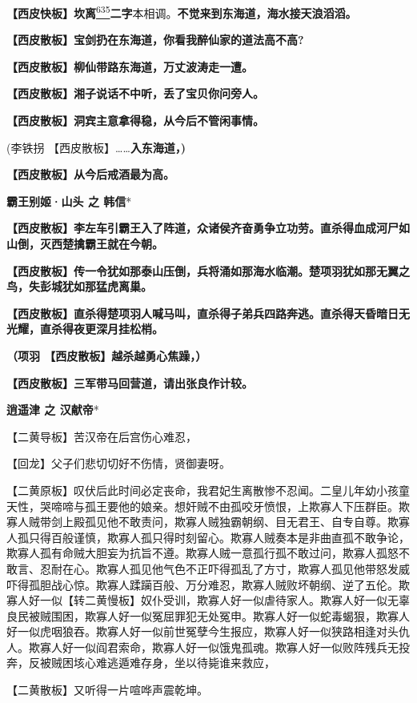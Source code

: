 \textbf{【西皮快板】坎离}\protect\hyperlink{fn635}{\textsuperscript{635}}\textbf{二字}本相调。\textbf{不觉来到东海道，海水接天浪滔滔。}

\textbf{【西皮散板】宝剑扔在东海道，你看我醉仙家的道法高不高?}

\textbf{【西皮散板】柳仙带路东海道，万丈波涛走一遭。}

\textbf{【西皮散板】湘子说话不中听，丢了宝贝你问旁人。}

\textbf{【西皮散板】洞宾主意拿得稳，从今后不管闲事情。}

(李铁拐 【西皮散板】\ldots{}\ldots{}\textbf{入东海道，)}

\textbf{【西皮散板】从今后戒酒最为高。}

\textbf{霸王别姬·山头 之 韩信}*

\textbf{【西皮散板】李左车引霸王入了阵道，众诸侯齐奋勇争立功劳。直杀得血成河尸如山倒，灭西楚擒霸王就在今朝。}

\textbf{【西皮散板】传一令犹如那泰山压倒，兵将涌如那海水临潮。楚项羽犹如那无翼之鸟，失彭城犹如那猛虎离巢。}

\textbf{【西皮散板】直杀得楚项羽人喊马叫，直杀得子弟兵四路奔逃。直杀得天昏暗日无光耀，直杀得夜更深月挂松梢。}

\textbf{（项羽 【西皮散板】越杀越勇心焦躁，）}

\textbf{【西皮散板】三军带马回营道，请出张良作计较。}

\textbf{逍遥津 之 汉献帝}*

【二黄导板】苦汉帝在后宫伤心难忍，

【回龙】父子们悲切切好不伤情，贤御妻呀。

【二黄原板】叹伏后此时间必定丧命，我君妃生离散惨不忍闻。二皇儿年幼小孩童天性，哭啼啼与孤王要他的娘亲。想奸贼不由孤咬牙愤恨，上欺寡人下压群臣。欺寡人贼带剑上殿孤见他不敢责问，欺寡人贼独霸朝纲、目无君王、自专自尊。欺寡人孤只得百般谨慎，欺寡人孤只得时刻留心。欺寡人贼奏本是非曲直孤不敢争论，欺寡人孤有命贼大胆妄为抗旨不遵。欺寡人贼一意孤行孤不敢过问，欺寡人孤怒不敢言、忍耐在心。欺寡人孤见他气色不正吓得孤乱了方寸，欺寡人孤见他带怒发威吓得孤胆战心惊。欺寡人蹂躏百般、万分难忍，欺寡人贼败坏朝纲、逆了五伦。欺寡人好一似【转二黄慢板】奴仆受训，欺寡人好一似虐待家人。欺寡人好一似无辜良民被贼围困，欺寡人好一似冤屈罪犯无处冤申。欺寡人好一似蛇毒蝎狠，欺寡人好一似虎咽狼吞。欺寡人好一似前世冤孽今生报应，欺寡人好一似狭路相逢对头仇人。欺寡人好一似阎君索命，欺寡人好一似饿鬼孤魂。欺寡人好一似败阵残兵无投奔，反被贼困垓心难逃遁难存身，坐以待毙谁来救应，

【二黄散板】又听得一片喧哗声震乾坤。

